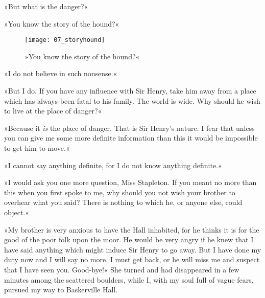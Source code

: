 »But what is the danger?«

»You know the story of the hound?«

\begin{figure}[tbhp]
\centering
\texttt{[image: 07\_storyhound]}
\caption{»You know the story of the hound?«}
\end{figure}

»I do not believe in such nonsense.«

»But I do. If you have any influence with Sir Henry, take him away from a place which has always been fatal to his family. The world is wide. Why should he wish to live at the place of danger?«

»Because it \textit{is} the place of danger. That is Sir Henry's nature. I fear that unless you can give me some more definite information than this it would be impossible to get him to move.«

»I cannot say anything definite, for I do not know anything definite.«

»I would ask you one more question, Miss Stapleton. If you meant no more than this when you first spoke to me, why should you not wish your brother to overhear what you said? There is nothing to which he, or anyone else, could object.«

»My brother is very anxious to have the Hall inhabited, for he thinks it is for the good of the poor folk upon the moor. He would be very angry if he knew that I have said anything which might induce Sir Henry to go away. But I have done my duty now and I will say no more. I must get back, or he will miss me and suspect that I have seen you. Good-bye!« She turned and had disappeared in a few minutes among the scattered boulders, while I, with my soul full of vague fears, pursued my way to Baskerville Hall.

